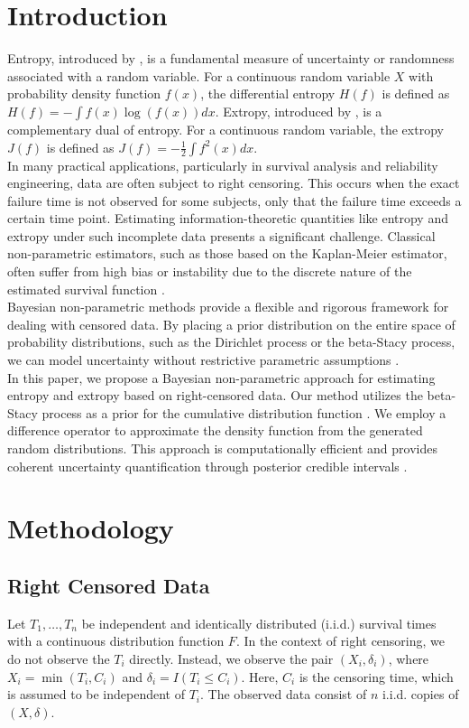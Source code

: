 \documentclass[twoside]{article}
\begin{document}
\section{Introduction}
Entropy, introduced by 
\citep{10}, 
is a fundamental measure of uncertainty or randomness associated with a random variable. 
For a continuous random variable 
$X$ 
with probability density function 
$f(x)$, 
the differential entropy 
$H(f)$ 
is defined as 
$H(f) = -\int f(x) \log(f(x)) dx$. 
Extropy, introduced by 
\citep{7}, is a complementary dual of entropy. 
For a continuous random variable, the extropy 
$J(f)$ 
is defined as 
$J(f) = -\frac{1}{2} \int f^{2}(x) dx$. 
\\
In many practical applications, particularly in survival analysis and reliability engineering, data are often subject to right censoring. 
This occurs when the exact failure time is not observed for some subjects, only that the failure time exceeds a certain time point. 
Estimating information-theoretic quantities like entropy and extropy under such incomplete data presents a significant challenge. 
Classical non-parametric estimators, such as those based on the Kaplan-Meier estimator, often suffer from high bias or instability due to the discrete nature of the estimated survival function 
\citep{6}. 
\\
Bayesian non-parametric methods provide a flexible and rigorous framework for dealing with censored data. 
By placing a prior distribution on the entire space of probability distributions, such as the Dirichlet process or the beta-Stacy process, we can model uncertainty without restrictive parametric assumptions 
\citep{5,6}. 
\\
In this paper, we propose a Bayesian non-parametric approach for estimating entropy and extropy based on right-censored data. 
Our method utilizes the beta-Stacy process as a prior for the cumulative distribution function
\citep{3}. 
We employ a difference operator to approximate the density function from the generated random distributions. 
This approach is computationally efficient and provides coherent uncertainty quantification through posterior credible intervals
\citep{0}. 
\section{Methodology}


\subsection{Right Censored Data}
Let 
$T_{1}, \ldots, T_{n}$
be independent and identically distributed (i.i.d.) survival times with a continuous distribution function $F$. 
In the context of right censoring, we do not observe the 
$T_i$ 
directly. 
Instead, we observe the pair 
$(X_i, \delta_i)$, 
where 
$X_i = \min(T_i, C_i)$ 
and 
$\delta_i = I(T_i \leq C_i)$. 
Here, 
$C_i$ 
is the censoring time, which is assumed to be independent of 
$T_i$. 
The observed data consist of 
$n$ 
i.i.d. copies of 
$(X, \delta)$. 
\end{document}
